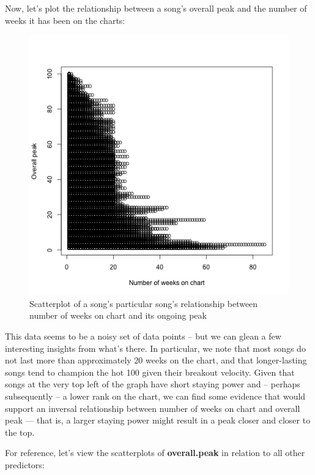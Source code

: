 \documentclass[11pt]{article} %
\begin{document}
Now, let's plot the relationship between a song's overall peak and the number of weeks it has been on the charts:

\begin{figure}[H]
	\label{Figure 1}
	\caption{Scatterplot of a song's particular song's relationship between number of weeks on chart and its ongoing peak}
	\includegraphics[scale = 0.5]{plots/weeks_v_overall_peak}
	\centering
\end{figure}

This data seems to be a noisy set of data points -- but we can glean a few interesting insights from what's there. In particular, we note that most songs do not last more than approximately 20 weeks on the chart, and that longer-lasting songs tend to champion the hot 100 given their breakout velocity. Given that songs at the very top left of the graph have short staying power and -- perhaps subsequently -- a lower rank on the chart, we can find some evidence that would support an inversal relationship between number of weeks on chart and overall peak --- that is, a larger staying power might result in a peak closer and closer to the top.

For reference, let's view the scatterplots of \textbf{overall.peak} in relation to all other predictors:
\end{document}
